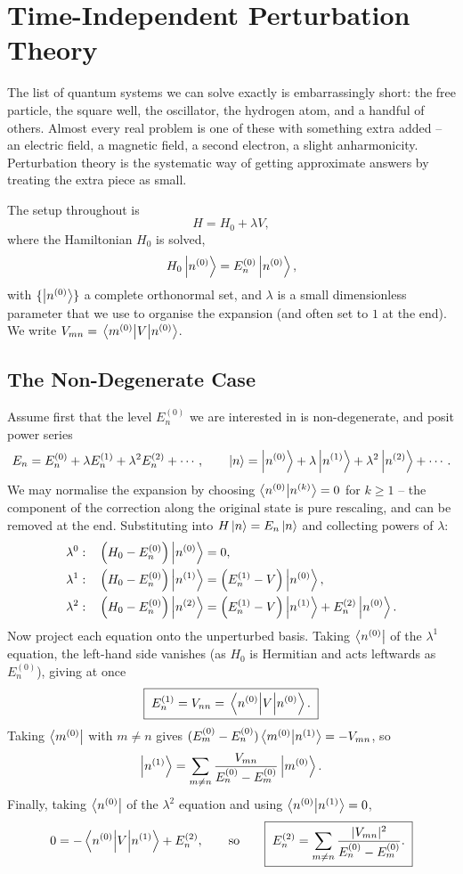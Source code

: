 \documentclass[a4paper]{scrartcl}
\begin{document}
\section{Time-Independent Perturbation Theory}\label{sec:pt}

The list of quantum systems we can solve exactly is embarrassingly short: the free particle, the square well, the oscillator, the hydrogen atom, and a handful of others. Almost every real problem is one of these with something extra added -- an electric field, a magnetic field, a second electron, a slight anharmonicity. Perturbation theory is the systematic way of getting approximate answers by treating the extra piece as small.

The setup throughout is
$$
H = H_0 + \lambda V,
$$
where the  Hamiltonian $H_0$ is solved,
$$
H_0 \ket{n^{(0)}} = E_n^{(0)}\ket{n^{(0)}},
$$
with $\{\ket{n^{(0)}}\}$ a complete orthonormal set, and $\lambda$ is a small dimensionless parameter that we use to organise the expansion (and often set to $1$ at the end). We write $V_{mn} = \mel{m^{(0)}}{V}{n^{(0)}}$.

\subsection{The Non-Degenerate Case}

Assume first that the level $E_n^{(0)}$ we are interested in is non-degenerate, and posit power series
$$
E_n = E_n^{(0)} + \lambda E_n^{(1)} + \lambda^2 E_n^{(2)} + \cdots, \qquad
\ket{n} = \ket{n^{(0)}} + \lambda \ket{n^{(1)}} + \lambda^2\ket{n^{(2)}} + \cdots.
$$
We may normalise the expansion by choosing $\braket{n^{(0)}}{n^{(k)}} = 0$ for $k\geq1$ -- the component of the correction along the original state is pure rescaling, and can be removed at the end. Substituting into $H\ket n = E_n \ket n$ and collecting powers of $\lambda$:
\begin{align*}
    \lambda^0: & \quad \left( H_0 - E_n^{(0)} \right)\ket{n^{(0)}} = 0, \\
    \lambda^1: & \quad \left( H_0 - E_n^{(0)} \right)\ket{n^{(1)}} = \left( E_n^{(1)} - V \right)\ket{n^{(0)}}, \\
    \lambda^2: & \quad \left( H_0 - E_n^{(0)} \right)\ket{n^{(2)}} = \left( E_n^{(1)} - V \right)\ket{n^{(1)}} + E_n^{(2)}\ket{n^{(0)}}.
\end{align*}
Now project each equation onto the unperturbed basis. Taking $\bra{n^{(0)}}$ of the $\lambda^1$ equation, the left-hand side vanishes (as $H_0$ is Hermitian and acts leftwards as $E_n^{(0)}$), giving at once
$$
\boxed{\;E_n^{(1)} = V_{nn} = \mel{n^{(0)}}{V}{n^{(0)}}.\;}
$$
Taking $\bra{m^{(0)}}$ with $m \neq n$ gives $(E_m^{(0)} - E_n^{(0)})\braket{m^{(0)}}{n^{(1)}} = -V_{mn}$, so
$$
\ket{n^{(1)}} = \sum_{m\neq n}\frac{V_{mn}}{E_n^{(0)} - E_m^{(0)}}\ket{m^{(0)}}.
$$
Finally, taking $\bra{n^{(0)}}$ of the $\lambda^2$ equation and using $\braket{n^{(0)}}{n^{(1)}} = 0$,
$$
0 = -\mel{n^{(0)}}{V}{n^{(1)}} + E_n^{(2)}, \qquad \text{so} \qquad
\boxed{\;E_n^{(2)} = \sum_{m\neq n}\frac{\lvert V_{mn}\rvert^2}{E_n^{(0)} - E_m^{(0)}}.\;}
$$
\end{document}
